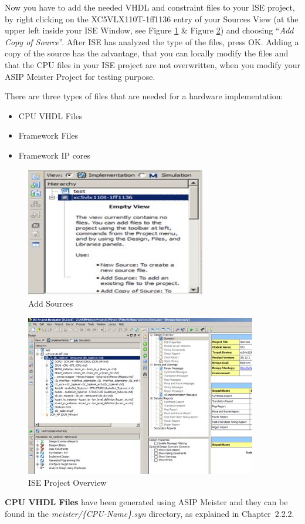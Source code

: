 Now you have to add the needed VHDL and constraint files to your ISE
project, by right clicking on the XC5VLX110T-1ff1136 entry of your
Sources View (at the upper left inside your ISE Window, see Figure \ref{fig:fig63} \&
Figure \ref{fig:fig64}) and choosing ``\emph{Add Copy of
Source}''. After ISE has analyzed the type of the files, press OK.
Adding a copy of the source has the advantage, that you can locally
modify the files and that the CPU files in your ISE project are not
overwritten, when you modify your ASIP Meister Project for testing
purpose.

There are three types of files that are needed for a hardware
implementation:

\begin{itemize}
\item
  CPU VHDL Files
\item
  Framework Files
\item
  Framework IP cores
\end{itemize}
\begin{figure}[!htb]
	\centering
	\includegraphics[width=0.7\textwidth]{src/images/6-3.png}
	\caption{Add Sources}
	\label{fig:fig63}
\end{figure}
\begin{figure}[!htb]
	\centering
	\includegraphics[width=0.9\textwidth]{src/images/6-4.png}
	\caption{ISE Project Overview}
	\label{fig:fig64}
\end{figure}
\textbf{CPU VHDL Files} have been generated using ASIP Meister and they
can be found in the \emph{meister/\{CPU-Name\}.syn} directory, as
explained in Chapter~2.2.2.

